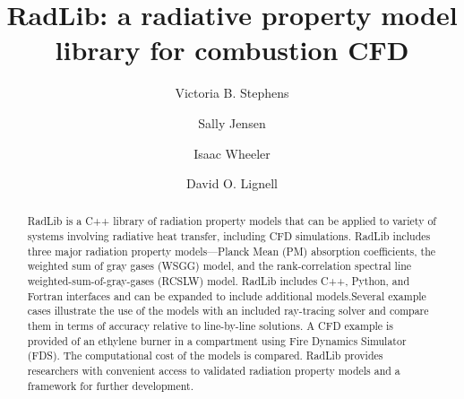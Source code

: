 \documentclass[preprint,12pt]{elsarticle}
\begin{document}
\begin{frontmatter}



\title{RadLib: a radiative property model library for combustion CFD}




\author{Victoria B. Stephens}
\author{Sally Jensen}
\author{Isaac Wheeler}
\author{David O. Lignell}


\address{Department of Chemical Engineering, Brigham Young University, Provo, UT 84602, United States}


\begin{abstract}
    RadLib is a C++ library of radiation property models that can be applied to variety of systems involving radiative heat transfer, including CFD simulations. RadLib includes three major radiation property models---Planck Mean (PM) absorption coefficients, the weighted sum of gray gases (WSGG) model, and the rank-correlation spectral line weighted-sum-of-gray-gases (RCSLW) model. RadLib includes C++, Python, and Fortran interfaces and can be expanded to include additional models.Several example cases illustrate the use of the models with an included ray-tracing solver and compare them in terms of accuracy relative to line-by-line solutions. A CFD example is provided of an ethylene burner in a compartment using Fire Dynamics Simulator (FDS). The computational cost of the models is compared. RadLib provides researchers with convenient access to validated radiation property models and a framework for further development. 
\end{abstract}


\end{frontmatter}
\end{document}
